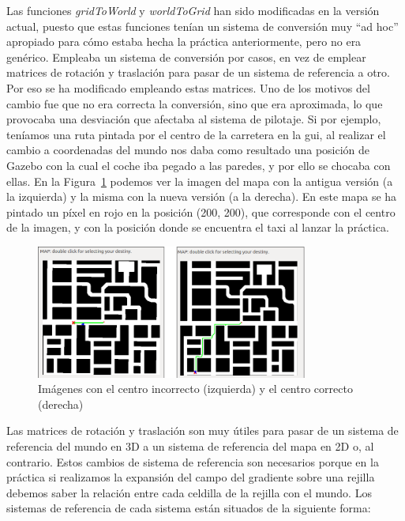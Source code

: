 Las funciones \textit{gridToWorld} y \textit{worldToGrid} han sido modificadas en la versión actual, puesto que estas funciones tenían un sistema de conversión muy ``ad hoc'' apropiado para cómo estaba hecha la práctica anteriormente, pero no era genérico. Empleaba un sistema de conversión por casos, en vez de emplear matrices de rotación y traslación para pasar de un sistema de referencia a otro. Por eso se ha modificado empleando estas matrices. Uno de los motivos del cambio fue que no era correcta la conversión, sino que era aproximada, lo que provocaba una desviación que afectaba al sistema de pilotaje. Si por ejemplo, teníamos una ruta pintada por el centro de la carretera en la \acrshort{gui}, al realizar el cambio a coordenadas del mundo nos daba como resultado una posición de Gazebo con la cual el coche iba pegado a las paredes, y por ello se chocaba con ellas. En la Figura~\ref{fig.centros} podemos ver la imagen del mapa con la antigua versión (a la izquierda) y la misma con la nueva versión (a la derecha). En este mapa se ha pintado un píxel en rojo en la posición (200, 200), que corresponde con el centro de la imagen, y con la posición donde se encuentra el taxi al lanzar la práctica. 

\begin{figure}[H]
  \begin{center}
    \includegraphics[width=0.8\textwidth]{figures/GPP/centros.png}
		\caption{Imágenes con el centro incorrecto (izquierda) y el centro correcto (derecha)}
		\label{fig.centros}
		\end{center}
\end{figure}

Las matrices de rotación y traslación son muy útiles para pasar de un sistema de referencia del mundo en 3D a un sistema de referencia del mapa en 2D o, al contrario. Estos cambios de sistema de referencia son necesarios porque en la práctica si realizamos la expansión del campo del gradiente sobre una rejilla debemos saber la relación entre cada celdilla de la rejilla con el mundo. Los sistemas de referencia de cada sistema están situados de la siguiente forma:

